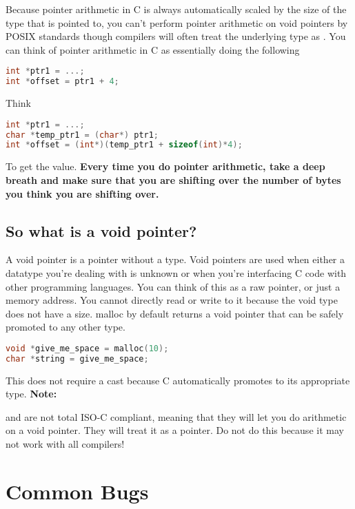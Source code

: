Because pointer arithmetic in C is always automatically scaled by the size of the type that is pointed to, you can't perform pointer
arithmetic on void pointers by POSIX standards though compilers will often treat the underlying type as .
You can think of pointer arithmetic in C as essentially doing the
following

\begin{lstlisting}[language=C]
int *ptr1 = ...;
int *offset = ptr1 + 4;
\end{lstlisting}

Think

\begin{lstlisting}[language=C]
int *ptr1 = ...;
char *temp_ptr1 = (char*) ptr1;
int *offset = (int*)(temp_ptr1 + sizeof(int)*4);
\end{lstlisting}

To get the value. \textbf{Every time you do pointer arithmetic, take a deep breath and make sure that you are shifting over the number of bytes you think you are shifting over.}

\subsection{So what is a void pointer?}

A void pointer is a pointer without a type.
Void pointers are used when either a datatype you're dealing with is unknown or when you're interfacing C code with other programming languages.
You can think of this as a raw pointer, or just a memory address.
You cannot directly read or write to it because the void type does not have a size.
malloc by default returns a void pointer that can be safely promoted to any other type.

\begin{lstlisting}[language=C]
void *give_me_space = malloc(10);
char *string = give_me_space;
\end{lstlisting}

This does not require a cast because C automatically promotes  to its appropriate type. \textbf{Note:}

 and  are not total ISO-C compliant, meaning that they will let you do arithmetic on a void pointer.
They will treat it as a  pointer.
Do not do this because it may not work with all compilers!

\section{Common Bugs}


